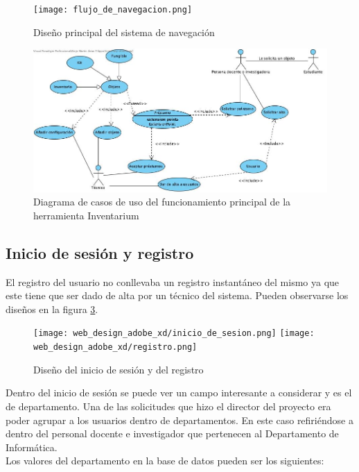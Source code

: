 \begin{figure}[ht]
    \texttt{[image: flujo\_de\_navegacion.png]}
    \caption{Diseño principal del sistema de navegación}\label{diseno_principal_sistema_navegacion}
\end{figure}

\begin{figure}[ht]
    \includegraphics[width=\textwidth,height=\textheight,keepaspectratio]{../../diagramas/visual_paradigm/funcionamiento_principal.jpg}
    \caption{Diagrama de casos de uso del funcionamiento principal de la herramienta Inventarium}\label{funcionamiento_principal_casos_de_uso}
\end{figure}


\subsection{Inicio de sesión y registro}

El registro del usuario no conllevaba un registro instantáneo del mismo ya que este tiene que ser dado de alta por un técnico del sistema. Pueden observarse los diseños en la figura \ref{inicio_registro_design}.

\begin{figure}[ht]
    \begin{center}
        \texttt{[image: web\_design\_adobe\_xd/inicio\_de\_sesion.png]}
        \texttt{[image: web\_design\_adobe\_xd/registro.png]}
        \caption{Diseño del inicio de sesión y del registro}\label{inicio_registro_design}
    \end{center}
\end{figure}

Dentro del inicio de sesión se puede ver un campo interesante a considerar y es el de departamento. Una de las solicitudes que hizo el director del proyecto era poder agrupar a los usuarios dentro de departamentos. En este caso refiriéndose a dentro del personal docente e investigador que pertenecen al Departamento de Informática.
\\Los valores del departamento en la base de datos pueden ser los siguientes:

